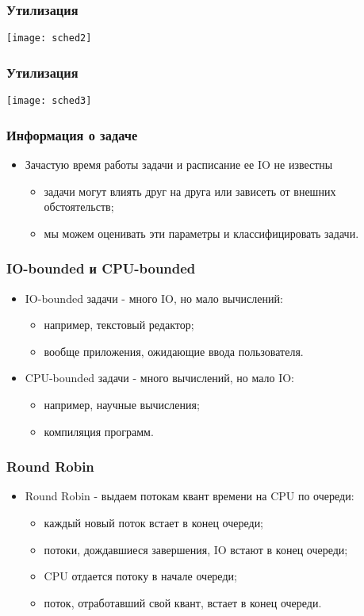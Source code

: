 \begin{frame}
\frametitle{Утилизация}
\texttt{[image: sched2]}
\end{frame}

\begin{frame}
\frametitle{Утилизация}
\texttt{[image: sched3]}
\end{frame}

\begin{frame}
\frametitle{Информация о задаче}
\begin{itemize}
    \item<1->Зачастую время работы задачи и расписание ее IO не известны
    \begin{itemize}
        \item<2->задачи могут влиять друг на друга или зависеть от внешних
             обстоятельств;
        \item<3->мы можем оценивать эти параметры и классифицировать задачи.
    \end{itemize}
\end{itemize}
\end{frame}

\begin{frame}
\frametitle{IO-bounded и CPU-bounded}
\begin{itemize}
    \item<1->IO-bounded задачи - много IO, но мало вычислений:
    \begin{itemize}
        \item<2->например, текстовый редактор;
        \item<2->вообще приложения, ожидающие ввода пользователя.
    \end{itemize}
    \item<3->CPU-bounded задачи - много вычислений, но мало IO:
    \begin{itemize}
        \item<4->например, научные вычисления;
        \item<4->компиляция программ.
    \end{itemize}
\end{itemize}
\end{frame}

\begin{frame}
\frametitle{Round Robin}
\begin{itemize}
    \item<1->Round Robin - выдаем потокам квант времени на CPU по очереди:
    \begin{itemize}
        \item<2->каждый новый поток встает в конец очереди;
        \item<3->потоки, дождавшиеся завершения, IO встают в конец очереди;
        \item<4->CPU отдается потоку в начале очереди;
        \item<5->поток, отработавший свой квант, встает в конец очереди.
    \end{itemize}
\end{itemize}
\end{frame}

